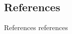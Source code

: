 \documentclass{beamer}
\begin{document}
\subsection*{References}
\begin{frame}{References}
	references
\end{frame}



	
\end{document}
